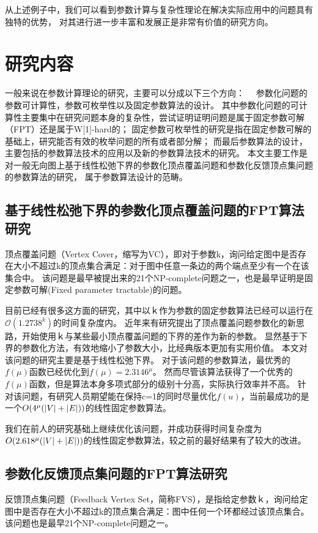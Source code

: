从上述例子中，我们可以看到参数计算与复杂性理论在解决实际应用中的问题具有独特的优势，
对其进行进一步丰富和发展正是非常有价值的研究方向。



\section{研究内容}
一般来说在参数计算理论的研究，主要可以分成以下三个方向：　
参数化问题的参数可计算性，参数可枚举性以及固定参数算法的设计。
其中参数化问题的可计算性主要集中在研究问题本身的复杂性，尝试证明证明问题是属于固定参数可解（FPT）还是属于W[1]-hard的；
固定参数可枚举性的研究是指在固定参数可解的基础上，研究能否有效的枚举问题的所有或者部分解；
而最后参数算法的设计，主要包括的参数算法技术的应用以及新的参数算法技术的研究。
本文主要工作是对一般无向图上基于线性松弛下界的参数化顶点覆盖问题和参数化反馈顶点集问题的参数算法的研究，
属于参数算法设计的范畴。

\subsection{基于线性松弛下界的参数化顶点覆盖问题的FPT算法研究}
顶点覆盖问题（Vertex Cover，缩写为VC），即对于参数k，询问给定图中是否存在大小不超过k的顶点集合满足：对于图中任意一条边的两个端点至少有一个在该集合中。
该问题是最早被提出来的21个NP-complete问题之一，也是最早证明是固定参数可解(Fixed parameter tractable)的问题。

目前已经有很多这方面的研究，其中以ｋ作为参数的固定参数算法已经可以运行在$\mathcal{O}(1.2738^k)$的时间复杂度内。
近年来有研究提出了顶点覆盖问题参数化的新思路，开始使用ｋ与某些最小顶点覆盖问题的下界的差作为新的参数。
显然基于下界的参数化方法，有效地缩小了参数大小，比经典版本更加有实用价值。
本文对该问题的研究主要是基于线性松弛下界。
对于该问题的参数算法，最优秀的$f(\mu)$函数已经优化到$f(\mu) = 2.3146^\mu$。
然而尽管该算法获得了一个优秀的$f(\mu)$函数，但是算法本身多项式部分的级别十分高，实际执行效率并不高。
针对该问题，有研究人员期望能在保持c=1的同时尽量优化$f(u)$，当前最成功的是一个$O(4^{\mu}(\left\vert V \right\vert+\left\vert E \right\vert))$的线性固定参数算法。

我们在前人的研究基础上继续优化该问题，并成功获得时间复杂度为$O(2.618^{\mu}(\left\vert V \right\vert+\left\vert E \right\vert))$的线性固定参数算法，较之前的最好结果有了较大的改进。
\subsection{参数化反馈顶点集问题的FPT算法研究}
反馈顶点集问题（Feedback Vertex Set，简称FVS），是指给定参数ｋ，询问给定图中是否存在大小不超过k的顶点集合满足：图中任何一个环都经过该顶点集合。
该问题也是最早21个NP-complete问题之一。

